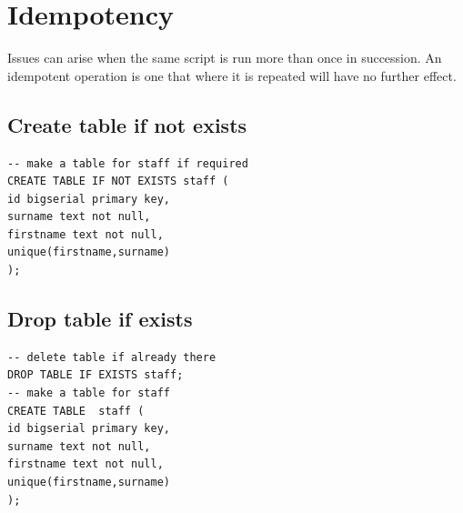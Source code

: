 \documentclass{pgnotes}
\begin{document}
\section{Idempotency}

Issues can arise when the same script is run more than once in succession.
An idempotent operation is one that where it is repeated will have no further effect.

\subsection{Create table if not exists}


\begin{verbatim}
-- make a table for staff if required
CREATE TABLE IF NOT EXISTS staff ( 
id bigserial primary key,
surname text not null,
firstname text not null,
unique(firstname,surname)
);
\end{verbatim}


\subsection{Drop table if exists}

\begin{verbatim}
-- delete table if already there
DROP TABLE IF EXISTS staff;
-- make a table for staff
CREATE TABLE  staff ( 
id bigserial primary key,
surname text not null,
firstname text not null,
unique(firstname,surname)
);
\end{verbatim}
\end{document}
